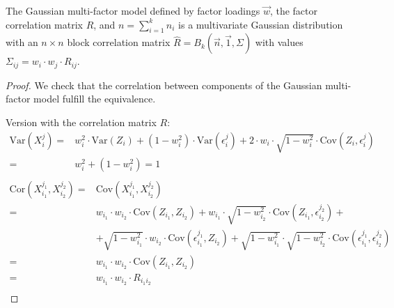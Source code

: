 \documentclass[11pt,fleqn]{book} %
\begin{document}
\begin{proposition}
	\label{prop:gmfigs}
	The Gaussian multi-factor model defined by factor loadings $\vec{w}$,
	the factor correlation matrix $R$, and $n = \sum_{i=1}^k n_i$ is a 
	multivariate Gaussian distribution with an $n {\times} n$ block 
	correlation matrix $\widehat{R}=B_k(\vec{n},\vec{1},\Sigma)$ 
	with values $\Sigma_{ij} = w_i \cdot w_j \cdot R_{ij}$.
\end{proposition}
\begin{proof}
	We check that the correlation between components of the Gaussian multi-factor 
	model fulfill the equivalence.
	
	Version with the correlation matrix $R$:
	\begin{displaymath}
		\begin{array}{rl}
			\text{Var}(X_i^j) =                       &
			w_i^2 \cdot \text{Var}(Z_i) + (1-w_i^2) \cdot \text{Var}(\epsilon_i^j) +
			2 \cdot w_i \cdot \sqrt{1-w_i^2} \cdot \text{Cov}(Z_i, \epsilon_i^j)    \\
			=                                         & w_i^2 + (1-w_i^2) = 1       \\
		\end{array}
	\end{displaymath}
	\begin{displaymath}
		\begin{array}{rl}
			\text{Cor}(X_{i_1}^{j_1},X_{i_2}^{j_2}) = & \text{Cov}(X_{i_1}^{j_1},X_{i_2}^{j_2})                                               \\
			=                                         & w_{i_1} \cdot w_{i_2} \cdot \text{Cov}(Z_{i_1},Z_{i_2}) +
			                                            w_{i_1} \cdot \sqrt{1-w_{i_2}^2} \cdot \text{Cov}(Z_{i_1}, \epsilon_{i_2}^{j_2}) +    \\
			                                          & + \sqrt{1-w_{i_1}^2} \cdot w_{i_2} \cdot \text{Cov}(\epsilon_{i_1}^{j_1}, Z_{i_2}) +
			                                            \sqrt{1-w_{i_1}^2} \cdot \sqrt{1-w_{i_2}^2} \cdot 
			                                            \text{Cov}(\epsilon_{i_1}^{j_1}, \epsilon_{i_2}^{j_2})                                \\
			=                                         & w_{i_1} \cdot w_{i_2} \cdot \text{Cov}(Z_{i_1}, Z_{i_2})                              \\
			=                                         & w_{i_1} \cdot w_{i_2} \cdot R_{i_1i_2}                                                \\

\end{array}
\end{displaymath}
\end{proof}
\end{document}
